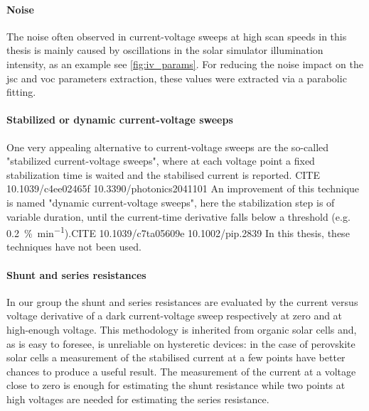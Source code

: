 \paragraph{Noise} The noise often observed in current-voltage sweeps at high scan speeds in this thesis is mainly caused by oscillations in the solar simulator illumination intensity, as an example see \cref{fig:iv_params}. For reducing the noise impact on the \gls{jsc} and \gls{voc} parameters extraction, these values were extracted via a parabolic fitting. %

\paragraph{Stabilized or dynamic current-voltage sweeps} One very appealing alternative to current-voltage sweeps are the so-called "stabilized current-voltage sweeps", where at each voltage point a fixed stabilization time is waited and the stabilised current is reported. CITE 10.1039/c4ee02465f 10.3390/photonics2041101
An improvement of this technique is named "dynamic current-voltage sweeps", here the stabilization step is of variable duration, until the current-time derivative falls below a threshold (e.g. \SI{0.2}{\%\per\minute}).CITE 10.1039/c7ta05609e 10.1002/pip.2839
In this thesis, these techniques have not been used.

\paragraph{Shunt and series resistances} \label{resistances} In our group the shunt and series resistances are evaluated by the current versus voltage derivative of a dark current-voltage sweep respectively at zero and at high-enough voltage. This methodology is inherited from organic solar cells and, as is easy to foresee, is unreliable on hysteretic devices: in the case of perovskite solar cells a measurement of the stabilised current at a few points have better chances to produce a useful result. The measurement of the current at a voltage close to zero is enough for estimating the shunt resistance while two points at high voltages are needed for estimating the series resistance.

